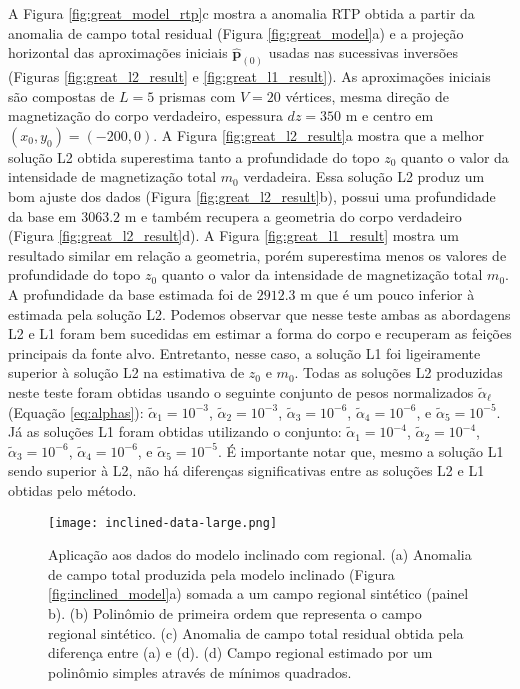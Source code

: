 A Figura \ref{fig:great_model_rtp}c mostra a anomalia RTP obtida a partir da anomalia de campo total residual (Figura \ref{fig:great_model}a) e 
a projeção horizontal das aproximações iniciais $\hat{\mathbf{p}}_{(0)}$ 
usadas nas sucessivas inversões (Figuras \ref{fig:great_l2_result} e 
\ref{fig:great_l1_result}).
As aproximações iniciais são compostas de $ L= 5$ prismas com $ V = 20 $ vértices, mesma direção de magnetização do corpo verdadeiro, espessura $ dz=350 $ m e centro em $ (x_0, y_0) = (-200, 0) $.
A Figura \ref{fig:great_l2_result}a mostra que a melhor solução L2 obtida superestima tanto a profundidade do topo $z_{0}$ quanto o valor da intensidade de magnetização total $m_{0}$ verdadeira. Essa solução L2 produz um bom ajuste dos dados (Figura \ref{fig:great_l2_result}b), possui uma profundidade da base em $3063.2$ m e também recupera a geometria do corpo verdadeiro (Figura \ref{fig:great_l2_result}d).
A Figura \ref{fig:great_l1_result} mostra um resultado similar em relação a geometria, porém superestima menos os valores de profundidade do topo $z_{0}$ quanto o valor da intensidade de magnetização total $m_{0}$. A profundidade da base estimada foi de $2912.3$ m que é um pouco inferior à estimada pela solução L2.
Podemos observar que nesse teste ambas as abordagens L2 e L1 foram bem sucedidas em estimar a forma do corpo e recuperam as feições principais da fonte alvo. Entretanto, nesse caso, a solução L1 foi ligeiramente superior à solução L2 na estimativa de $ z_0 $ e $ m_0 $.
Todas as soluções L2 produzidas neste teste foram obtidas usando o seguinte conjunto de pesos normalizados $\tilde{\alpha}_{\ell}$ (Equação \ref{eq:alphas}): 
$\tilde{\alpha}_{1} = 10^{-3}$, $\tilde{\alpha}_{2} = 10^{-3}$, 
$\tilde{\alpha}_{3} = 10^{-6}$, $\tilde{\alpha}_{4} = 10^{-6}$, e 
$\tilde{\alpha}_{5} = 10^{-5}$. 
Já as soluções L1 foram obtidas utilizando o conjunto: 
$\tilde{\alpha}_{1} = 10^{-4}$, $\tilde{\alpha}_{2} = 10^{-4}$, 
$\tilde{\alpha}_{3} = 10^{-6}$, $\tilde{\alpha}_{4} = 10^{-6}$, e 
$\tilde{\alpha}_{5} = 10^{-5}$.
É importante notar que, mesmo a solução L1 sendo superior à L2, não há diferenças significativas entre as soluções L2 e L1 obtidas pelo método.

\begin{figure}[!htb]
	\texttt{[image: inclined-data-large.png]}
	\caption{Aplicação aos dados do modelo inclinado com regional. 
		(a) Anomalia de campo total produzida pela modelo inclinado (Figura \ref{fig:inclined_model}a) somada a um campo regional sintético (painel b).
		(b) Polinômio de primeira ordem que representa o campo regional sintético.
		(c) Anomalia de campo total residual obtida pela diferença entre (a) e (d). (d) Campo regional estimado por um polinômio simples através de mínimos quadrados.
	}
	\label{fig:great_data}
\end{figure}
\pagebreak

